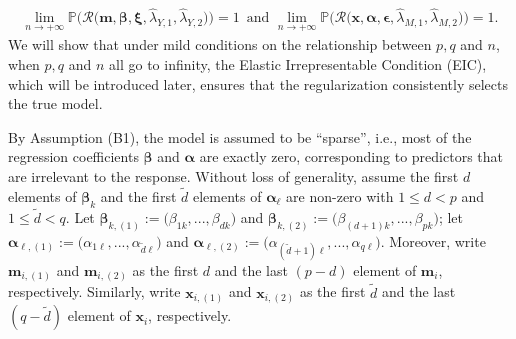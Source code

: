 \documentclass[
  12pt]{article}
\def\M{\mathbf{m}}
\def\X{\mathbf{x}}
\begin{document}
\begin{align*}
\lim_{n   \rightarrow   +\infty} \mathbb{P} \Big( \mathcal{R} \big( \M , \bm{\beta}, \bm{\xi}, \widehat{\lambda}_{Y,1} , \widehat{\lambda}_{Y,2} \big) \Big) = 1
\, \textrm{ and }
\lim_{n   \rightarrow   +\infty} \mathbb{P} \Big( \mathcal{R} \big( \X , \bm{\alpha} , \bm{\epsilon}, \widehat{\lambda}_{M,1} , \widehat{\lambda}_{M,2} \big) \Big) = 1.
\end{align*}
We will show that under mild conditions on the relationship between $p, q$ and $n$, when $p, q$ and $n$ all go to infinity, the Elastic Irrepresentable Condition  (EIC), which will be introduced later, ensures that the regularization consistently selects the true model.

\bigskip

By Assumption (B1), the model is assumed to be ``sparse'', i.e., most of the regression coefficients $\bm{\beta}$ and $\bm{\alpha}$ are exactly zero, corresponding to predictors that are irrelevant to the response. Without loss of generality, assume the first $d$ elements of $\bm{\beta}_{k}$ and the first $\widetilde{d}$ elements of $\bm{\alpha}_{\ell}$ are non-zero with $1 \leq d < p$ and $1 \leq \widetilde{d} < q$. Let $\bm{\beta}_{k,(1)} := \big( \beta_{1k} , ..., \beta_{dk} \big)$ and $\bm{\beta}_{k,(2)} := \big( \beta_{(d+1)k} , ..., \beta_{pk} \big)$;
let
$\bm{\alpha}_{\ell,(1)} := \big( \alpha_{1\ell} ,  ..., \alpha_{\widetilde{d} \ell} \big)$ and $\bm{\alpha}_{\ell,(2)} := \big( \alpha_{(\widetilde{d}+1) \ell} , ..., \alpha_{q \ell} \big)$.
Moreover, write $\M_{i,(1)}$ and $\M_{i,(2)}$ as the first $d$ and the last $(p-d)$ element of $\M_{i}$, respectively.
Similarly, write $\X_{i,(1)}$ and $\X_{i,(2)}$ as the first $\widetilde{d}$ and the last $(q-\widetilde{d})$ element of $\X_{i}$, respectively.
\end{document}
